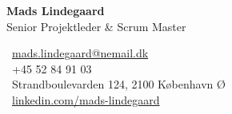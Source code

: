 \documentclass[10pt,a4paper]{article}
\begin{document}
\begin{minipage}[t]{\textwidth}
    \begin{tcolorbox}[
        colback=primary,
        colframe=primary,
        arc=4pt,
        boxrule=0pt,
        top=15pt,
        bottom=15pt,
        left=15pt,
        right=15pt,
        coltext=white
    ]
        \begin{minipage}[t]{0.55\textwidth}
            {\huge\bfseries Mads Lindegaard} \\[4pt]
            {\large\color{bordergray} Senior Projektleder \& Scrum Master}
        \end{minipage}%
        \begin{minipage}[t]{0.45\textwidth}
            \raggedleft
            \small
            \faEnvelope\ \href{mailto:mads.lindegaard@nemail.dk}{\color{white}mads.lindegaard@nemail.dk} \\{}%
            \faPhone\ +45 52 84 91 03 \\{}%
            \faMapMarker\ Strandboulevarden 124, 2100 København Ø \\{}%
            \faLinkedin\ \href{https://linkedin.com/in/mads-lindegaard}{\color{white}linkedin.com/mads-lindegaard}
        \end{minipage}
    \end{tcolorbox}
\end{minipage}

\vspace{0.3cm}
\end{document}
